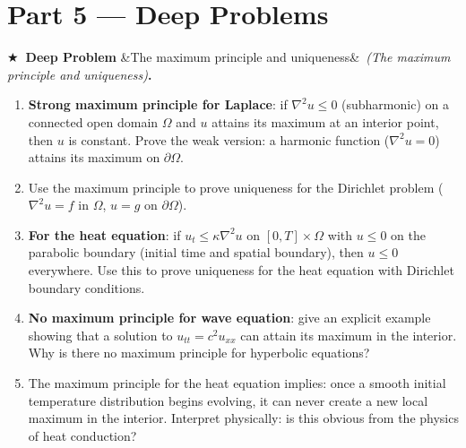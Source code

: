 \documentclass[12pt,a4paper]{article}
\newcounter{problem}
\newcounter{deepproblem}
\newenvironment{deepproblem}[1][]{\refstepcounter{deepproblem}\par\vspace{6pt}\noindent\textbf{\color{NavyBlue}$\bigstar$\ Deep Problem \thedeepproblem}\ifx&#1&\else\ \textit{(#1)}\fi\textbf{.}\enskip}{\par\vspace{4pt}}
\begin{document}
\section{Part 5 \texorpdfstring{---}{--} Deep Problems}

\begin{deepproblem}[The maximum principle and uniqueness]
\begin{enumerate}[label=(\alph*)]
  \item \textbf{Strong maximum principle for Laplace}: if $\nabla^2 u \leq 0$ (subharmonic) on a connected open domain $\Omega$ and $u$ attains its maximum at an interior point, then $u$ is constant. Prove the weak version: a harmonic function ($\nabla^2 u=0$) attains its maximum on $\partial\Omega$.
  \item Use the maximum principle to prove uniqueness for the Dirichlet problem ($\nabla^2 u=f$ in $\Omega$, $u=g$ on $\partial\Omega$).
  \item \textbf{For the heat equation}: if $u_t \leq \kappa\nabla^2 u$ on $[0,T]\times\Omega$ with $u\leq 0$ on the parabolic boundary (initial time and spatial boundary), then $u\leq 0$ everywhere. Use this to prove uniqueness for the heat equation with Dirichlet boundary conditions.
  \item \textbf{No maximum principle for wave equation}: give an explicit example showing that a solution to $u_{tt}=c^2u_{xx}$ can attain its maximum in the interior. Why is there no maximum principle for hyperbolic equations?
  \item The maximum principle for the heat equation implies: once a smooth initial temperature distribution begins evolving, it can never create a new local maximum in the interior. Interpret physically: is this obvious from the physics of heat conduction?
\end{enumerate}
\end{deepproblem}
\end{document}
